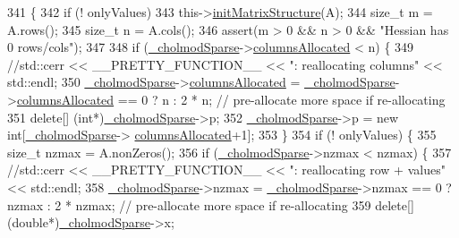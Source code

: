 \begin{DoxyCode}
341     \{
342       \textcolor{keywordflow}{if} (! onlyValues)
343         this->\hyperlink{classg2o_1_1LinearSolverCCS_a070138d7e2a68a576e015f5073a4a464}{initMatrixStructure}(A);
344       \textcolor{keywordtype}{size\_t} m = A.rows();
345       \textcolor{keywordtype}{size\_t} n = A.cols();
346       assert(m > 0 && n > 0 && \textcolor{stringliteral}{"Hessian has 0 rows/cols"});
347 
348       \textcolor{keywordflow}{if} (\hyperlink{classg2o_1_1LinearSolverCholmod_aefbdba58c18dc9eac831eb3d7c24fa18}{\_cholmodSparse}->\hyperlink{structg2o_1_1CholmodExt_a17fb33389283164f05225ed9670cb8c1}{columnsAllocated} < n) \{
349         \textcolor{comment}{//std::cerr << \_\_PRETTY\_FUNCTION\_\_ << ": reallocating columns" << std::endl;}
350         \hyperlink{classg2o_1_1LinearSolverCholmod_aefbdba58c18dc9eac831eb3d7c24fa18}{\_cholmodSparse}->\hyperlink{structg2o_1_1CholmodExt_a17fb33389283164f05225ed9670cb8c1}{columnsAllocated} = 
      \hyperlink{classg2o_1_1LinearSolverCholmod_aefbdba58c18dc9eac831eb3d7c24fa18}{\_cholmodSparse}->\hyperlink{structg2o_1_1CholmodExt_a17fb33389283164f05225ed9670cb8c1}{columnsAllocated} == 0 ? n : 2 * n; \textcolor{comment}{// pre-allocate more space
       if re-allocating}
351         \textcolor{keyword}{delete}[] (\textcolor{keywordtype}{int}*)\hyperlink{classg2o_1_1LinearSolverCholmod_aefbdba58c18dc9eac831eb3d7c24fa18}{\_cholmodSparse}->p;
352         \hyperlink{classg2o_1_1LinearSolverCholmod_aefbdba58c18dc9eac831eb3d7c24fa18}{\_cholmodSparse}->p = \textcolor{keyword}{new} \textcolor{keywordtype}{int}[\hyperlink{classg2o_1_1LinearSolverCholmod_aefbdba58c18dc9eac831eb3d7c24fa18}{\_cholmodSparse}->
      \hyperlink{structg2o_1_1CholmodExt_a17fb33389283164f05225ed9670cb8c1}{columnsAllocated}+1];
353       \}
354       \textcolor{keywordflow}{if} (! onlyValues) \{
355         \textcolor{keywordtype}{size\_t} nzmax = A.nonZeros();
356         \textcolor{keywordflow}{if} (\hyperlink{classg2o_1_1LinearSolverCholmod_aefbdba58c18dc9eac831eb3d7c24fa18}{\_cholmodSparse}->nzmax < nzmax) \{
357           \textcolor{comment}{//std::cerr << \_\_PRETTY\_FUNCTION\_\_ << ": reallocating row + values" << std::endl;}
358           \hyperlink{classg2o_1_1LinearSolverCholmod_aefbdba58c18dc9eac831eb3d7c24fa18}{\_cholmodSparse}->nzmax = \hyperlink{classg2o_1_1LinearSolverCholmod_aefbdba58c18dc9eac831eb3d7c24fa18}{\_cholmodSparse}->nzmax == 0 ? nzmax : 2 * 
      nzmax; \textcolor{comment}{// pre-allocate more space if re-allocating}
359           \textcolor{keyword}{delete}[] (\textcolor{keywordtype}{double}*)\hyperlink{classg2o_1_1LinearSolverCholmod_aefbdba58c18dc9eac831eb3d7c24fa18}{\_cholmodSparse}->x;

\end{DoxyCode}
